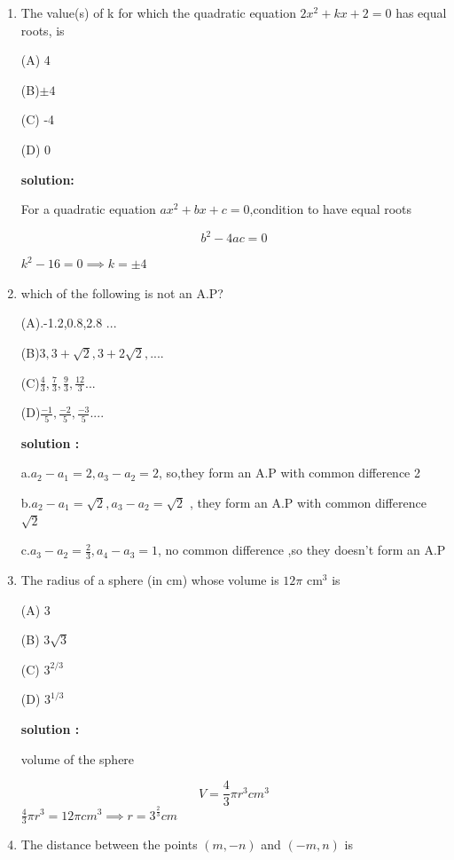 

\begin{enumerate}
    \item The value(s) of k for which the quadratic equation $2x^2 + kx + 2 = 0$ has equal roots, is

(A) 4

(B)$\pm 4$

(C) -4

(D) 0 

\textbf{solution:}

For a quadratic equation $ ax^2+bx+c=0$,condition to have equal roots 

\begin{equation}
b^2-4ac=0 \tag{1.1}    
\end{equation}

$k^2-16=0 \implies k=\pm 4$


   \item which of the following is not an A.P?

(A).-1.2,0.8,2.8 ...

(B)$3,3+\sqrt{2},3+2\sqrt{2},....$

(C)$\frac{4}{3},\frac{7}{3},\frac{9}{3},\frac{12}{3}...$

(D)$\frac{-1}{5},\frac{-2}{5},\frac{-3}{5}....$

\textbf{solution :}

a.$a_2-a_1= 2,a_3-a_2=2 $, so,they form an A.P with common difference 2

b.$a_2-a_1=\sqrt{2}, a_3-a_2=\sqrt{2}$ , they form an A.P with common difference $\sqrt{2}$

c.$a_3-a_2=\frac{2}{3},a_4-a_3=1$, no common difference ,so they doesn't form an A.P

\item The radius of a sphere (in cm) whose volume is $12\pi\text{ cm}^{3}$ is

(A) 3   

(B) $3\sqrt{3}$

(C) $3^{2/3}$

(D) $3^{1/3}$

\textbf{solution :}

volume of the sphere

\begin{equation}
    V=\frac{4}{3}\pi r^3 cm^3 \tag{3.1}
\end{equation}
$\frac{4}{3}\pi r^3 = 12 \pi cm^3 \implies r= 3^{\frac{2}{3}} cm $

\item The distance between the points $(m, -n)$ and $(-m, n)$ is


\end{enumerate}
